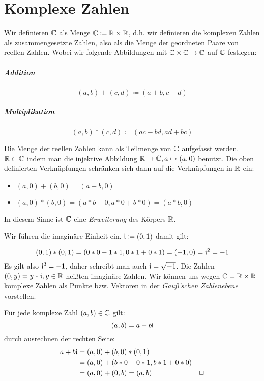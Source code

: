 \chapter{Komplexe Zahlen}
Wir definieren $\mathbb{C}$ als Menge $\mathbb{C}\coloneqq\mathbb{R}\times\mathbb{R}$, d.h. wir definieren die komplexen Zahlen als zusammengesetzte Zahlen, also als die Menge der geordneten Paare von reellen Zahlen.
Wobei wir folgende Abbildungen mit $\mathbb{C}\times\mathbb{C}\rightarrow\mathbb{C}$ auf $\mathbb{C}$ festlegen:
\paragraph{Addition}
\begin{equation*}
  (a,b) + (c,d) \coloneqq (a+b,c+d)
\end{equation*}
\paragraph{Multiplikation}
\begin{equation*}
  (a,b) * (c,d) \coloneqq (ac-bd,ad+bc)
\end{equation*}

\bemerkung
Die Menge der reellen Zahlen kann als Teilmenge von $\mathbb{C}$ aufgefasst werden. $\mathbb{R}\subset\mathbb{C}$ indem man die injektive Abbildung $\mathbb{R}\rightarrow\mathbb{C}, a\mapsto (a,0)$ benutzt. Die oben definierten Verknüpfungen schränken sich dann auf die Verknüpfungen in $\mathbb{R}$ ein:
\begin{itemize}
  \item $(a,0)+(b,0)=(a+b,0)$
  \item $(a,0)*(b,0)=(a* b - 0, a* 0+ b* 0) = (a* b,0)$
\end{itemize}
In diesem Sinne ist $\mathbb{C}$ eine \emph{Erweiterung} des Körpers $\mathbb{R}$.

Wir führen die imaginäre Einheit ein.
$\mathfrak{i}\coloneqq (0,1)$ damit gilt:

\begin{equation*}
  (0,1)*(0,1) = (0*0 -1*1,0*1+0*1)=(-1,0)=\mathfrak{i}^2=-1
\end{equation*}
Es gilt also $\mathfrak{i}^2=-1$, daher schreibt man auch $\mathfrak{i}=\sqrt{-1}$. Die Zahlen $(0,y)=y*\mathfrak{i}, y\in\mathbb{R}$ heißten imaginäre Zahlen.
Wir können uns wegen $\mathbb{C}=\mathbb{R}\times\mathbb{R}$ komplexe Zahlen als Punkte bzw. Vektoren in der \emph{Gauß'schen Zahlenebene} vorstellen.

\satz{}
Für jede komplexe Zahl $(a,b)\in\mathbb{C}$ gilt:
\begin{equation*}
  (a,b)=a+b\mathfrak{i}
\end{equation*}
\beweis durch ausrechnen der rechten Seite:
\begin{align*}
  a+b\mathfrak{i} &= (a,0)+(b,0)*(0,1)\\
  &=(a,0)+(b*0-0*1,b*1+0*0)\\
  &=(a,0)+(0,b)=(a,b) &\Box
\end{align*}

